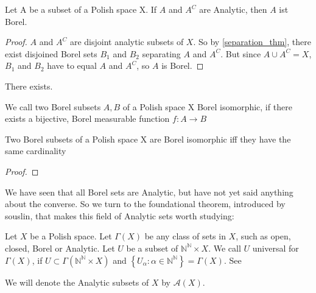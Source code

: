 \documentclass[10pt, a4paper, titlepage]{article}
\numberwithin{equation}{section}
\begin{document}
\begin{theorem}
	Let A be a subset of a Polish space X. If $A$ and  $A^{C}$ are Analytic, then $A$ ist Borel.  
\end{theorem}
\begin{proof}
	$A$ and  $A^C$ are disjoint analytic subsets of $X$. 
	So by  \autoref{separation_thm}, there exist disjoined Borel sets  $B_1$ and $B_2$ separating $A$ and $A^C$. 
	But since $A \cup A^C = X$,  $B_1$ and $B_2$ have to equal $A$ and $A^C$, so  $A$ is Borel.
\end{proof}

\begin{theorem}
	There exists.
\end{theorem}



\begin{definition}
	We call two Borel subsets $A,B$ of a Polish space X Borel isomorphic, if there exists a bijective, Borel measurable function $f: A \to B$
\end{definition}


\begin{theorem}
	Two Borel subsets of a Polish space X are Borel isomorphic iff they have the same cardinality
\end{theorem}
\begin{proof}
	
\end{proof}


We have seen that all Borel sets are Analytic, but have not yet said anything about the converse. So we turn to the foundational theorem, introduced by souslin, that makes this field of Analytic sets worth studying:
\begin{definition}
Let $X$ be a Polish space. 
Let $\Gamma\left( X \right) $ be any class of sets in $X$, such as open, closed, Borel or Analytic. 
Let $U$ be a subset of $\mathbb{N}^\mathbb{N} \times X $. 
We call $U$ universal for  $\Gamma\left( X \right) $, 
if $U \subset \Gamma\left( \mathbb{N}^\mathbb{N} \times X \right) $ and $\left\{ U_{\alpha}\colon \alpha \in \mathbb{N}^\mathbb{N} \right\} = \Gamma\left( X \right) $. See \cite{kechris1995}
\end{definition}
\begin{remark}
	
We will denote the Analytic subsets of $X$ by $\mathcal{A}\left( X \right) $. 
\end{remark}
\end{document}
